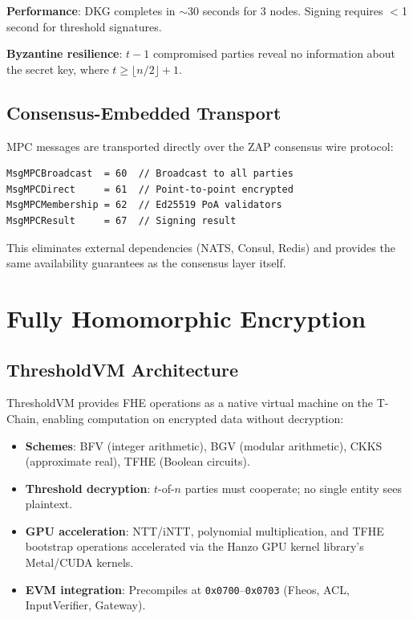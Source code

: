 \documentclass[11pt,letterpaper]{article}
\begin{document}
\textbf{Performance}: DKG completes in $\sim$30 seconds for 3 nodes. Signing requires $<$1 second for threshold signatures.

\textbf{Byzantine resilience}: $t-1$ compromised parties reveal no information about the secret key, where $t \geq \lfloor n/2 \rfloor + 1$.

\subsection{Consensus-Embedded Transport}

MPC messages are transported directly over the ZAP consensus wire protocol:

\begin{lstlisting}[caption={MPC message types in consensus transport.}]
MsgMPCBroadcast  = 60  // Broadcast to all parties
MsgMPCDirect     = 61  // Point-to-point encrypted
MsgMPCMembership = 62  // Ed25519 PoA validators
MsgMPCResult     = 67  // Signing result
\end{lstlisting}

This eliminates external dependencies (NATS, Consul, Redis) and provides the same availability guarantees as the consensus layer itself.

\section{Fully Homomorphic Encryption}

\subsection{ThresholdVM Architecture}

ThresholdVM provides FHE operations as a native virtual machine on the T-Chain, enabling computation on encrypted data without decryption:

\begin{itemize}
\item \textbf{Schemes}: BFV (integer arithmetic), BGV (modular arithmetic), CKKS (approximate real), TFHE (Boolean circuits).
\item \textbf{Threshold decryption}: $t$-of-$n$ parties must cooperate; no single entity sees plaintext.
\item \textbf{GPU acceleration}: NTT/iNTT, polynomial multiplication, and TFHE bootstrap operations accelerated via the Hanzo GPU kernel library's Metal/CUDA kernels.
\item \textbf{EVM integration}: Precompiles at \texttt{0x0700}--\texttt{0x0703} (Fheos, ACL, InputVerifier, Gateway).
\end{itemize}
\end{document}
